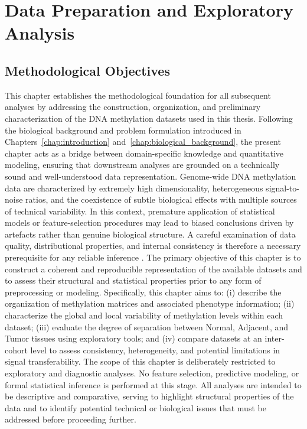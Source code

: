 \chapter{Data Preparation and Exploratory Analysis}
\label{sec:data_preparation_exploration}

\section{Methodological Objectives}
\label{sec:methodological_objectives}

This chapter establishes the methodological foundation for all subsequent analyses by addressing the construction, organization, and preliminary characterization of the DNA methylation datasets used in this thesis. Following the biological background and problem formulation introduced in Chapters~\ref{chap:introduction} and~\ref{chap:biological_background}, the present chapter acts as a bridge between domain-specific knowledge and quantitative modeling, ensuring that downstream analyses are grounded on a technically sound and well-understood data representation.
Genome-wide DNA methylation data are characterized by extremely high dimensionality, heterogeneous signal-to-noise ratios, and the coexistence of subtle biological effects with multiple sources of technical variability. In this context, premature application of statistical models or feature-selection procedures may lead to biased conclusions driven by artefacts rather than genuine biological structure. A careful examination of data quality, distributional properties, and internal consistency is therefore a necessary prerequisite for any reliable inference \cite{Yousefi2013}.
The primary objective of this chapter is to construct a coherent and reproducible representation of the available datasets and to assess their structural and statistical properties prior to any form of preprocessing or modeling. Specifically, this chapter aims to: (i) describe the organization of methylation matrices and associated phenotype information; (ii) characterize the global and local variability of methylation levels within each dataset; (iii) evaluate the degree of separation between Normal, Adjacent, and Tumor tissues using exploratory tools; and (iv) compare datasets at an inter-cohort level to assess consistency, heterogeneity, and potential limitations in signal transferability.
The scope of this chapter is deliberately restricted to exploratory and diagnostic analyses. No feature selection, predictive modeling, or formal statistical inference is performed at this stage. All analyses are intended to be descriptive and comparative, serving to highlight structural properties of the data and to identify potential technical or biological issues that must be addressed before proceeding further.
